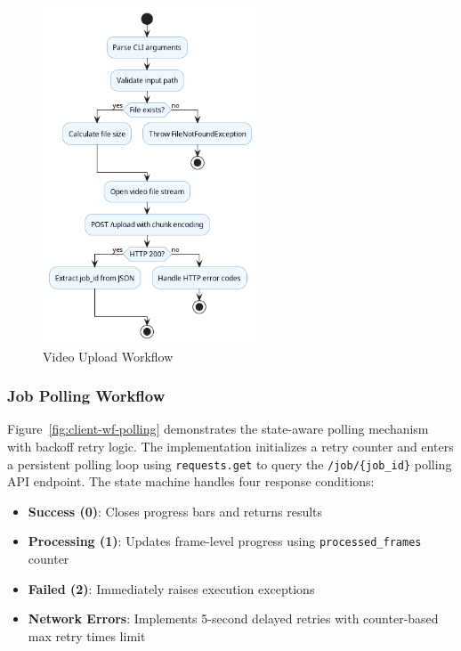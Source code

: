\documentclass[10pt,a4paper]{article}
\begin{document}
\begin{figure}[htbp]
    \centering
    \includegraphics[height=10cm]{client-wf-upload.png}
    \caption{Video Upload Workflow}
    \label{fig:client-wf-upload}
\end{figure}

\subsubsection{Job Polling Workflow}
Figure~\ref{fig:client-wf-polling} demonstrates the state-aware polling mechanism with backoff retry logic. The implementation initializes a retry counter and enters a persistent polling loop using \texttt{requests.get} \cite{python_requests_upload} to query the \texttt{/job/\{job\_id\}} polling API endpoint. The state machine handles four response conditions:
\begin{itemize}
    \item \textbf{Success (0)}: Closes progress bars and returns results
    \item \textbf{Processing (1)}: Updates frame-level progress using \texttt{processed\_frames} counter
    \item \textbf{Failed (2)}: Immediately raises execution exceptions
    \item \textbf{Network Errors}: Implements 5-second delayed retries with counter-based max retry times limit
\end{itemize}
\end{document}
